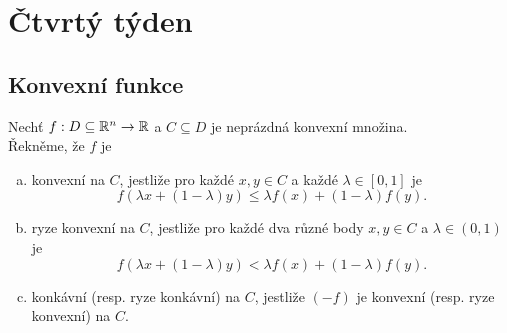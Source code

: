 \section{Čtvrtý týden}

\subsection{Konvexní funkce}
Nechť $f : D \subseteq \mathbb{R}^n \rightarrow \mathbb{R}$ a $C \subseteq D$ je neprázdná konvexní množina. \\
Řekněme, že $f$ je
\begin{enumerate}[(a)]
    \item konvexní na $C$, jestliže pro každé $x, y \in C$ a každé $\lambda \in [0,1]$ je 
    \[
        f(\lambda x + (1-\lambda) y) \leq \lambda f(x) + (1-\lambda)f(y).
    \]
    \item ryze konvexní na $C$, jestliže pro každé dva různé body $x, y \in C$ a $\lambda \in (0,1)$ je
    \[
        f(\lambda x + (1-\lambda) y) < \lambda f(x) + (1-\lambda)f(y).
    \]
    \item konkávní (resp. ryze konkávní) na $C$, jestliže $(-f)$ je konvexní (resp. ryze konvexní) na $C$.
\end{enumerate}

